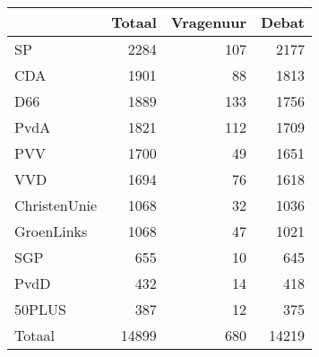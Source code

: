 \begin{tabular}{lrrr}
\toprule
{} &  Totaal &  Vragenuur &  Debat \\
\midrule
SP           &    2284 &        107 &   2177 \\
CDA          &    1901 &         88 &   1813 \\
D66          &    1889 &        133 &   1756 \\
PvdA         &    1821 &        112 &   1709 \\
PVV          &    1700 &         49 &   1651 \\
VVD          &    1694 &         76 &   1618 \\
ChristenUnie &    1068 &         32 &   1036 \\
GroenLinks   &    1068 &         47 &   1021 \\
SGP          &     655 &         10 &    645 \\
PvdD         &     432 &         14 &    418 \\
50PLUS       &     387 &         12 &    375 \\
\midrule
Totaal & 14899 & 680 & 14219 \\
\bottomrule
\end{tabular}